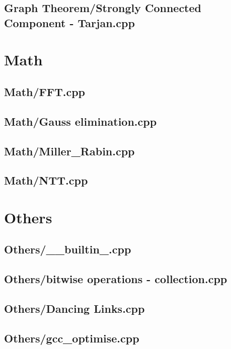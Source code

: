 \documentclass[a4paper,10pt,onecolumn,oneside]{article}
\begin{document}
\subsection{Graph Theorem/Strongly Connected Component - Tarjan.cpp}

\section{Math}
\subsection{Math/FFT.cpp}

\subsection{Math/Gauss elimination.cpp}

\subsection{Math/Miller\_Rabin.cpp}

\subsection{Math/NTT.cpp}

\section{Others}
\subsection{Others/\_\_builtin\_.cpp}

\subsection{Others/bitwise operations - collection.cpp}

\subsection{Others/Dancing Links.cpp}

\subsection{Others/gcc\_optimise.cpp}

\end{document}
